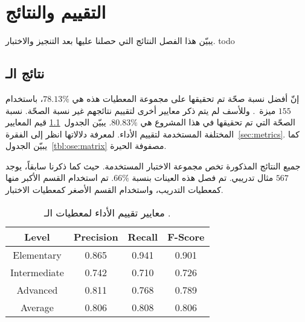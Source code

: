 

\chapter{التقييم والنتائج}
يبيّن هذا الفصل النتائج التي حصلنا عليها بعد التنجيز والاختبار. todo

\section{نتائج الـ }
إنّ أفضل نسبة صحّة تم تحقيقها على مجموعة المعطيات هذه هي $78.13\%$،
باستخدام $155$ ميزة~\cite{vajjala2018}.
وللأسف لم يتم ذكر معايير أخرى لتقييم نتائجهم غير نسبة الصحّة.
نسبة الصحّة التي تم تحقيقها في هذا المشروع هي $80.83\%$.
يبيّن الجدول~\ref{tbl:ose:metrics} قيم المعايير المختلفة المستخدمة لتقييم الأداء.
لمعرفة دلالاتها انظر إلى الفقرة~\ref{sec:metrics}.
كما يبيّن الجدول~\ref{tbl:ose:matrix} مصفوفة الحيرة.

جميع النتائج المذكورة تخص مجموعة الاختبار المستخدمة.
حيث كما ذكرنا سابقاً، يوجد $567$ مثال تدريبي.
تم فصل هذه العينات بنسبة $66\%$.
تم استخدام القسم الأكبر منها كمعطيات التدريب،
واستخدام القسم الأصغر كمعطيات الاختبار.

\begin{table}[htb]
	\centering
	{
		\setlength{\tabcolsep}{0.5em} %
		\renewcommand{\arraystretch}{1.4}%
		
		\begin{tabular}{|c|c|c|c|}
			\hline
			
			Level &
			Precision &
			Recall &
			F-Score \\
			\hline
			
			Elementary &
			0.865 &
			0.941 &
			0.901 \\
			\hline
			
			Intermediate &
			0.742 &
			0.710 &
			0.726 \\
			\hline
			
			Advanced &
			0.811 &
			0.768 &
			0.789 \\
			\hline
			
			Average &
			0.806 &
			0.808 &
			0.806 \\
			\hline
			
		\end{tabular}
	}
	\caption{%
		معايير تقييم الأداء لمعطيات الـ .
	}
	\label{tbl:ose:metrics}
\end{table}

